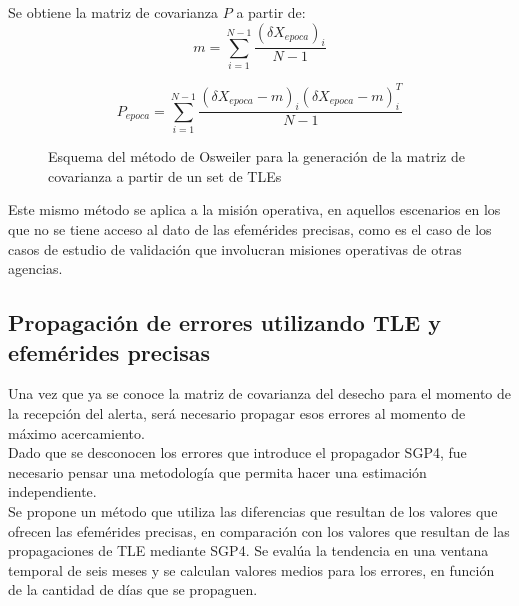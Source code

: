 {Se obtiene la matriz de covarianza $P$ a partir de:\\

\begin{equation}
 m=\sum_{i=1}^{N-1} \frac{(\delta X_{epoca})_{i}}{N-1} 
\end{equation}

\begin{equation}
 P_{epoca}=\sum_{i=1}^{N-1} \frac{(\delta X_{epoca}-m)_{i}(\delta X_{epoca}-m)_{i}^{T}}{N-1}
\end{equation}

\begin{figure}[!h]
\centering
{}
\caption[M\'etodo de Osweiler para la generaci\'on de la matriz de covarianza]{Esquema del m\'etodo de Osweiler para la generaci\'on de la matriz de covarianza a partir de un set de TLEs}
\label{fig:tleosw}
\end{figure}

Este mismo m\'etodo se aplica a la misi\'on operativa, en aquellos escenarios en los que no se tiene acceso al dato de las efem\'erides precisas, como es el caso de los casos de estudio de validaci\'on que involucran misiones operativas de otras agencias.\\

\subsection{Propagaci\'on de errores utilizando TLE y efem\'erides precisas}\label{subsec:tablaprop}
Una vez que ya se conoce la matriz de covarianza del desecho para el momento de la recepci\'on del alerta, ser\'a necesario propagar esos errores al momento de m\'aximo acercamiento.\\
Dado que se desconocen los errores que introduce el propagador SGP4, fue necesario pensar una metodolog\'ia que permita hacer una estimaci\'on independiente.\\
Se propone un m\'etodo que utiliza las diferencias que resultan de los valores que ofrecen las efem\'erides precisas, en comparaci\'on con los valores que resultan de las propagaciones de TLE mediante SGP4. Se eval\'ua la tendencia en una ventana temporal de seis meses y se calculan valores medios para los errores, en funci\'on de la cantidad de d\'ias que se propaguen.

}
